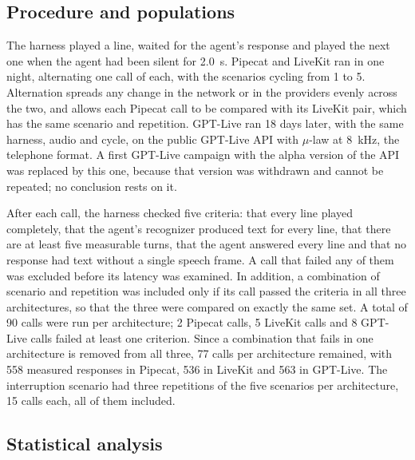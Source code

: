 \documentclass[11pt]{article}
\newcommand{\RAnalizadasA}{77}
\newcommand{\RCorridasA}{90}
\newcommand{\RIntLlamadasA}{15}
\newcommand{\RNA}{558}
\newcommand{\RNB}{536}
\newcommand{\RNC}{563}
\newcommand{\RRojasA}{2}
\newcommand{\RRojasB}{5}
\newcommand{\RRojasC}{8}
\begin{document}
\subsection{Procedure and populations}\label{sec:poblacion}

The harness played a line, waited for the agent's response and played the next one when the agent had been silent for 2.0~s. Pipecat and LiveKit ran in one night, alternating one call of each, with the scenarios cycling from 1
to 5. Alternation spreads any change in the network or in the providers evenly across
the two, and allows each Pipecat call to be compared with its LiveKit pair, which has the
same scenario and repetition. GPT-Live ran 18 days later, with the same harness, audio
and cycle, on the public GPT-Live API with $\mu$-law at 8~kHz, the telephone format. A
first GPT-Live campaign with the alpha version of the API was replaced by this one,
because that version was withdrawn and cannot be repeated; no conclusion rests on it.

After each call, the harness checked five criteria: that every line played
completely, that the agent's recognizer produced text for every line, that there are
at least five measurable turns, that the agent answered every line and that no
response had text without a single speech frame. A call that failed any of them was excluded before its latency was examined. In addition, a combination of scenario and repetition was included only if its call passed the criteria in all three architectures, so that the three were compared on exactly the same set. A total of \RCorridasA{} calls were run
per architecture; \RRojasA{} Pipecat calls, \RRojasB{} LiveKit calls and \RRojasC{} GPT-Live calls failed
at least one criterion. Since a combination that fails in one architecture is removed from all
three, \RAnalizadasA{} calls per architecture remained, with \RNA{} measured responses in Pipecat,
\RNB{} in LiveKit and \RNC{} in GPT-Live. The interruption scenario had three repetitions of
the five scenarios per architecture, \RIntLlamadasA{} calls each, all of them included.

\subsection{Statistical analysis}\label{sec:estadistica}
\end{document}
